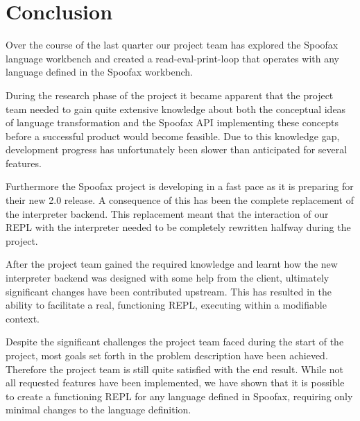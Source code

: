 \chapter{Conclusion}
\label{cha:conclusion}

Over the course of the last quarter our project team has explored the Spoofax
language workbench and created a read-eval-print-loop that operates with any
language defined in the Spoofax workbench.

During the research phase of the project it became apparent that the project
team needed to gain quite extensive knowledge about both the conceptual ideas
of language transformation and the Spoofax API implementing these concepts
before a successful product would become feasible. Due to this knowledge gap,
development progress has unfortunately been slower than anticipated for several
features.

Furthermore the Spoofax project is developing in a fast pace as it is preparing
for their new 2.0 release. A consequence of this has been the complete
replacement of the interpreter backend. This replacement meant that the
interaction of our REPL with the interpreter needed to be completely rewritten
halfway during the project.

After the project team gained the required knowledge and learnt how the new
interpreter backend was designed with some help from the client, ultimately
significant changes have been contributed upstream. This has resulted in the
ability to facilitate a real, functioning REPL, executing within a modifiable
context.

Despite the significant challenges the project team faced during the start of
the project, most goals set forth in the problem description have been
achieved. Therefore the project team is still quite satisfied with the end
result. While not all requested features have been implemented, we have shown
that it is possible to create a functioning REPL for any language defined in
Spoofax, requiring only minimal changes to the language definition.

